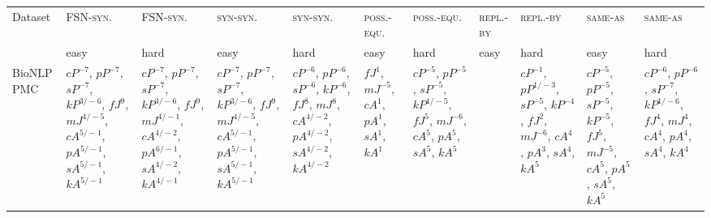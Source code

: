 \documentclass[letterpaper]{article} %
\newcommand{\dataset}[1]{\textsc{#1}}
\begin{document}
\begin{sidewaystable*}
    \centering
    \small
    \begin{tabular}{l l l l l l l l l l l }
    \toprule
         Dataset & \dataset{FSN-syn.} & \dataset{FSN-syn.} & \dataset{syn-syn.} & \dataset{syn-syn.}& \dataset{poss.-equ.} & \dataset{poss.-equ.} & \dataset{repl.-by} & \dataset{repl.-by} & \dataset{same-as} & \dataset{same-as} \\
& easy & hard & easy & hard& easy & hard & easy & hard & easy & hard \\ 
         \midrule
\multirow{10}{1.7cm}{BioNLP PMC} & \multirow{10}{1.7cm}{$cP^{-7}$, $pP^{-7}$, $sP^{-7}$, $kP^{3/-6}$, $fJ^{9}$, $mJ^{4/-5}$, $cA^{5/-1}$, $pA^{5/-1}$, $sA^{5/-1}$, $kA^{5/-1}$} & \multirow{10}{1.7cm}{$cP^{-7}$, $pP^{-7}$, $sP^{-7}$, $kP^{3/-6}$, $fJ^{9}$, $mJ^{4/-1}$, $cA^{4/-2}$, $pA^{6/-1}$, $sA^{4/-2}$, $kA^{4/-1}$} & \multirow{10}{1.7cm}{$cP^{-7}$, $pP^{-7}$, $sP^{-7}$, $kP^{3/-6}$, $fJ^{9}$, $mJ^{4/-5}$, $cA^{5/-1}$, $pA^{5/-1}$, $sA^{5/-1}$, $kA^{5/-1}$} & \multirow{10}{1.7cm}{$cP^{-6}$, $pP^{-6}$, $sP^{-6}$, $kP^{-6}$, $fJ^{8}$, $mJ^{8}$, $cA^{4/-2}$, $pA^{4/-2}$, $sA^{4/-2}$, $kA^{4/-2}$} & \multirow{10}{1.7cm}{$fJ^{1}$, $mJ^{-5}$, $cA^{1}$, $pA^{1}$, $sA^{1}$, $kA^{1}$} & \multirow{10}{1.7cm}{$cP^{-5}$, $pP^{-5}$, $sP^{-5}$, $kP^{1/-5}$, $fJ^{5}$, $mJ^{-6}$, $cA^{5}$, $pA^{5}$, $sA^{5}$, $kA^{5}$} & \multirow{10}{1.7cm}{} & \multirow{10}{1.7cm}{$cP^{-1}$, $pP^{1/-3}$, $sP^{-5}$, $kP^{-4}$, $fJ^{2}$, $mJ^{-6}$, $cA^{4}$, $pA^{3}$, $sA^{4}$, $kA^{5}$} & \multirow{10}{1.7cm}{$cP^{-5}$, $pP^{-5}$, $sP^{-5}$, $kP^{-5}$, $fJ^{5}$, $mJ^{-5}$, $cA^{5}$, $pA^{5}$, $sA^{5}$, $kA^{5}$} & \multirow{10}{1.7cm}{$cP^{-6}$, $pP^{-6}$, $sP^{-7}$, $kP^{1/-6}$, $fJ^{4}$, $mJ^{4}$, $cA^{4}$, $pA^{4}$, $sA^{4}$, $kA^{4}$} \\ \\ \\ \\ \\ \\ \\ \\ \\ \\
\midrule

\end{tabular}
\end{sidewaystable*}
\end{document}
